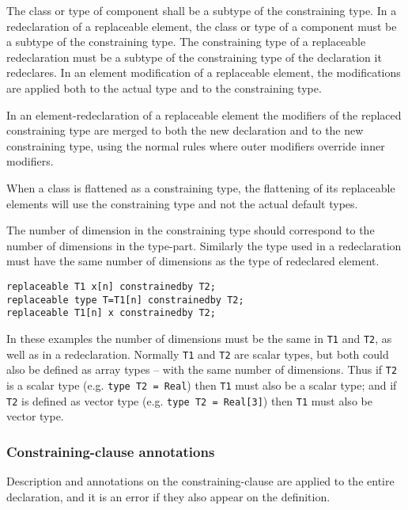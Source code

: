 The class or type of component shall be a subtype of the constraining
type. In a redeclaration of a replaceable element, the class or type of
a component must be a subtype of the constraining type. The constraining
type of a replaceable redeclaration must be a subtype of the
constraining type of the declaration it redeclares. In an element
modification of a replaceable element, the modifications are applied
both to the actual type and to the constraining type.

In an element-redeclaration of a replaceable element the modifiers of
the replaced constraining type are merged to both the new declaration
and to the new constraining type, using the normal rules where outer
modifiers override inner modifiers.

When a class is flattened as a constraining type, the flattening of its
replaceable elements will use the constraining type and not the actual
default types.

The number of dimension in the constraining type should correspond to
the number of dimensions in the type-part. Similarly the type used in a
redeclaration must have the same number of dimensions as the type of
redeclared element.

\begin{example}
\begin{lstlisting}[language=modelica]
replaceable T1 x[n] constrainedby T2;
replaceable type T=T1[n] constrainedby T2;
replaceable T1[n] x constrainedby T2;
\end{lstlisting}
In these examples the number of dimensions must be the same in \lstinline!T1!
and \lstinline!T2!, as well as in a redeclaration. Normally \lstinline!T1! and \lstinline!T2! are scalar
types, but both could also be defined as array types -- with the same
number of dimensions. Thus if \lstinline!T2! is a scalar type (e.g. \lstinline!type T2 = Real!)
then \lstinline!T1! must also be a scalar type; and if \lstinline!T2! is defined as vector type
  (e.g. \lstinline!type T2 = Real[3]!) then \lstinline!T1! must also be vector type.
\end{example}

\subsubsection{Constraining-clause annotations}

Description and annotations on the constraining-clause are applied to
the entire declaration, and it is an error if they also appear on the
definition.

